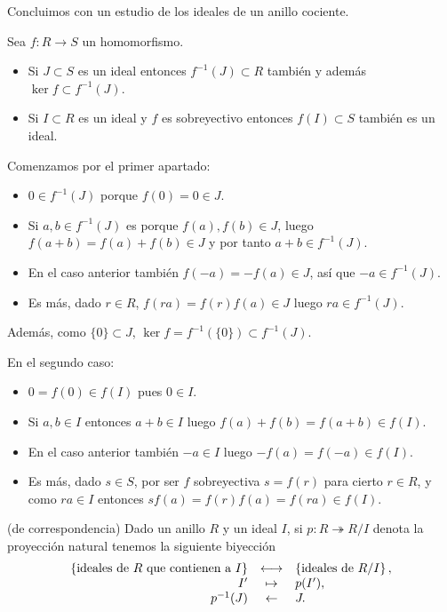 Concluimos con un estudio de los ideales de un anillo cociente.


Sea \(f\colon R\rightarrow S\) un homomorfismo.

\begin{itemize}
\item
  Si \(J\subset S\) es un ideal entonces \(f^{-1}(J)\subset R\) también
  y además \(\ker f\subset f^{-1}(J)\).
\item
  Si \(I\subset R\) es un ideal y \(f\) es sobreyectivo entonces
  \(f(I)\subset S\) también es un ideal.
\end{itemize}



Comenzamos por el primer apartado:

\begin{itemize}
\item
  \(0\in f^{-1}(J)\) porque \(f(0)=0\in J\).
\item
  Si \(a,b\in f^{-1}(J)\) es porque \(f(a),f(b)\in J\), luego
  \(f(a+b)=f(a)+f(b)\in J\) y por tanto \(a+b\in f^{-1}(J)\).
\item
  En el caso anterior también \(f(-a)=-f(a)\in J\), así que
  \(-a\in f^{-1}(J)\).
\item
  Es más, dado \(r\in R\), \(f(ra)=f( r )f(a)\in J\) luego
  \(ra\in f^{-1}(J)\).
\end{itemize}

Además, como \(\{0\}\subset J\),
\(\ker f=f^{-1}(\{0\})\subset f^{-1}(J)\).

En el segundo caso:

\begin{itemize}
\item
  \(0=f(0)\in f(I)\) pues \(0\in I\).
\item
  Si \(a,b\in I\) entonces \(a+b\in I\) luego
  \(f(a)+f(b)=f(a+b)\in f(I)\).
\item
  En el caso anterior también \(-a\in I\) luego \(-f(a)=f(-a)\in f(I)\).
\item
  Es más, dado \(s\in S\), por ser \(f\) sobreyectiva \(s=f( r )\) para
  cierto \(r\in R\), y como \(ra\in I\) entonces
  \(sf(a)=f( r )f(a)=f(ra)\in f(I)\).
\end{itemize}


\textrm{\normalfont (de correspondencia)} Dado un anillo
\(R\) y un ideal \(I\), si \(p\colon R\twoheadrightarrow R/I\) denota la
proyección natural tenemos la siguiente biyección
\[\begin{array}{rcl}\left\{\text{ideales de }R\text{ que contienen a }I\right\}&\longleftrightarrow& \left\{\text{ideales de }R/I\right\},\cr I'&\mapsto&p(I'),\cr p^{-1}(J)&\leftarrow&J.\end{array}\]

